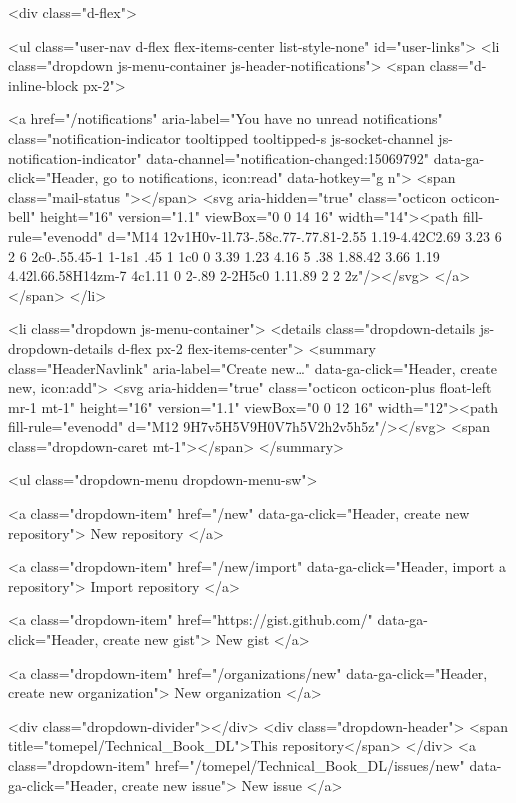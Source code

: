       <div class="d-flex">
        
<ul class="user-nav d-flex flex-items-center list-style-none" id="user-links">
  <li class="dropdown js-menu-container js-header-notifications">
    <span class="d-inline-block  px-2">
      
      <a href="/notifications" aria-label="You have no unread notifications" class="notification-indicator tooltipped tooltipped-s  js-socket-channel js-notification-indicator" data-channel="notification-changed:15069792" data-ga-click="Header, go to notifications, icon:read" data-hotkey="g n">
          <span class="mail-status "></span>
          <svg aria-hidden="true" class="octicon octicon-bell" height="16" version="1.1" viewBox="0 0 14 16" width="14"><path fill-rule="evenodd" d="M14 12v1H0v-1l.73-.58c.77-.77.81-2.55 1.19-4.42C2.69 3.23 6 2 6 2c0-.55.45-1 1-1s1 .45 1 1c0 0 3.39 1.23 4.16 5 .38 1.88.42 3.66 1.19 4.42l.66.58H14zm-7 4c1.11 0 2-.89 2-2H5c0 1.11.89 2 2 2z"/></svg>
</a>
    </span>
  </li>

  <li class="dropdown js-menu-container">
    <details class="dropdown-details js-dropdown-details d-flex px-2 flex-items-center">
      <summary class="HeaderNavlink"
         aria-label="Create new…"
         data-ga-click="Header, create new, icon:add">
        <svg aria-hidden="true" class="octicon octicon-plus float-left mr-1 mt-1" height="16" version="1.1" viewBox="0 0 12 16" width="12"><path fill-rule="evenodd" d="M12 9H7v5H5V9H0V7h5V2h2v5h5z"/></svg>
        <span class="dropdown-caret mt-1"></span>
      </summary>

      <ul class="dropdown-menu dropdown-menu-sw">
        
<a class="dropdown-item" href="/new" data-ga-click="Header, create new repository">
  New repository
</a>

  <a class="dropdown-item" href="/new/import" data-ga-click="Header, import a repository">
    Import repository
  </a>

<a class="dropdown-item" href="https://gist.github.com/" data-ga-click="Header, create new gist">
  New gist
</a>

  <a class="dropdown-item" href="/organizations/new" data-ga-click="Header, create new organization">
    New organization
  </a>



  <div class="dropdown-divider"></div>
  <div class="dropdown-header">
    <span title="tomepel/Technical_Book_DL">This repository</span>
  </div>
    <a class="dropdown-item" href="/tomepel/Technical_Book_DL/issues/new" data-ga-click="Header, create new issue">
      New issue
    </a>

